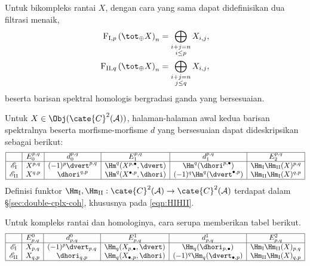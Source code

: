 Untuk bikompleks rantai $X$, dengan cara yang sama dapat didefinisikan dua
filtrasi menaik,
\begin{align*}
	\mathrm{F}_{\mathrm{I}, p} \left( \tot_{\oplus} X \right)_n & = \bigoplus_{\substack{i+j=n \\ i \leq p}} X_{i, j}, \\
	\mathrm{F}_{\mathrm{II}, q} \left( \tot_{\oplus} X \right)_n & = \bigoplus_{\substack{i+j=n \\ j \leq q}} X_{i, j},
\end{align*}
beserta barisan spektral homologis bergradasi ganda yang bersesuaian.

\begin{proposition}\label{prop:double-cplx-ss}
	Untuk $X\in\Obj(\cate{C}^2(\mathcal{A}))$, halaman-halaman awal kedua
	barisan spektralnya beserta morfisme-morfisme $d$ yang bersesuaian dapat
	dideskripsikan sebagai berikut:
	\[\begin{array}{|c|c|c|c|c|c|} \hline
		& E_0^{p,q} & d_0^{p,q} & E_1^{p,q} & d_1^{p,q} & E_2^{p,q} \\ \hline
		\mathscr{E}_{\mathrm{I}} & X^{p,q} & (-1)^p \dvert^{p,q} & \Hm^q(X^{p, \bullet}, \dvert) & \Hm^q(\dhori^{p, \bullet}) & \Hm_{\mathrm{I}}\Hm_{\mathrm{II}}(X)^{p,q} \\
		\mathscr{E}_{\mathrm{II}} & X^{q,p} & \dhori^{q,p} & \Hm^q(X^{\bullet, p}, \dhori) & (-1)^q \Hm^q(\dvert^{\bullet, p}) & \Hm_{\mathrm{II}} \Hm_{\mathrm{I}}(X)^{q,p} \\ \hline
	\end{array}\]
	Definisi funktor
	$\Hm_{\mathrm{I}},\Hm_{\mathrm{II}}:\cate{C}^2(\mathcal{A})
	\to\cate{C}^2(\mathcal{A})$ terdapat dalam
	\S\ref{sec:double-cplx-coh}, khususnya pada \eqref{eqn:HIHII}.

	Untuk kompleks rantai dan homologinya, cara serupa memberikan tabel berikut.
	\[\begin{array}{|c|c|c|c|c|c|} \hline
		& E^0_{p,q} & d^0_{p,q} & E^1_{p,q} & d^1_{p,q} & E^2_{p,q} \\ \hline
		\mathscr{E}_{\mathrm{I}} & X_{p,q} & (-1)^p \dvert_{p,q} & \Hm_q(X_{p, \bullet}, \dvert) & \Hm_q(\dhori_{p, \bullet}) & \Hm_{\mathrm{I}}\Hm_{\mathrm{II}}(X)_{p,q} \\
		\mathscr{E}_{\mathrm{II}} & X_{q,p} & \dhori_{q,p} & \Hm_q(X_{\bullet, p}, \dhori) & (-1)^q \Hm_q(\dvert_{\bullet, p}) & \Hm_{\mathrm{II}} \Hm_{\mathrm{I}}(X)_{q,p} \\ \hline
	\end{array}\]
\end{proposition}
